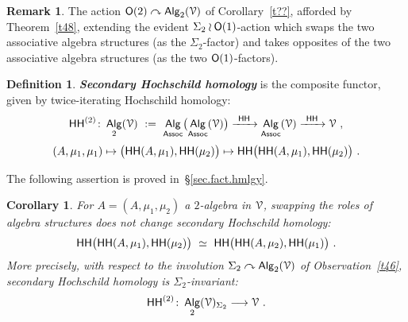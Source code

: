 \documentclass{amsart}
\newtheorem{cor}[theorem]{Corollary}
\theoremstyle{definition}
\newtheorem{definition}[theorem]{Definition}
\newtheorem{remark}[theorem]{Remark}
\theoremstyle{remark}
\DeclareMathOperator{\Alg}{\sf Alg}
\newcommand{\bit}[1]{\textbf{\textit{#1}}}
\newcommand{\lacts}{\curvearrowright}
\newcommand{\xra}{\xrightarrow}
\DeclareMathOperator{\sHH}{\sf HH}
\DeclareMathOperator{\HHt}{{\sf HH}^{(2)}}
\begin{document}
\begin{remark}
The action $\sO(2)
\lacts
\Alg_2(\cV)$ of Corollary~\ref{t??}, afforded by Theorem~\ref{t48}, 
extending the evident $\Sigma_2 \wr \mathsf O(1)$-action which swaps the two associative algebra structures (as the $\Sigma_2$-factor) and takes opposites of the two associative algebra structures (as the two $\mathsf O(1)$-factors).
\end{remark}






\begin{definition}
\label{d5}
\bit{Secondary Hochschild homology} is the composite functor, given by twice-iterating Hochschild homology:
\[
\HHt
\colon
\Alg_2(\cV)
~:=~
\Alg_{\sf Assoc}\bigl(
\Alg_{\sf Assoc}(\cV)
\bigr)
\xra{~\sHH~}
\Alg_{\sf Assoc}(\cV)
\xra{~\sHH~}
\cV
~,
\]
\[
(A,\mu_1,\mu_1)
\mapsto
\bigl( \sHH(A,\mu_1) , \sHH(\mu_2) \bigr)
\mapsto
\sHH\bigl( 
\sHH(A,\mu_1)
,
\sHH(\mu_2)
\bigr)
~.
\]

\end{definition}









The following assertion is proved in~\S\ref{sec.fact.hmlgy}.
\begin{cor}
\label{t45}
For $A = (A,\mu_1,\mu_2)$ a $2$-algebra in $\mathcal V$, swapping the roles of algebra structures does not change secondary Hochschild homology:
\[
\sHH\bigl( 
\sHH(A,\mu_1)
,
\sHH(\mu_2)
\bigr)
~\simeq~
\sHH\bigl( 
\sHH(A,\mu_2)
,
\sHH(\mu_1)
\bigr)
~.
\]
More precisely, with respect to the involution $\Sigma_2 \lacts \Alg_2(\cV)$ of Observation~\ref{t46}, secondary Hochschild homology is $\Sigma_2$-invariant:
\[
\HHt\colon \Alg_2(\cV)_{\Sigma_2}
\longrightarrow
\cV
~.
\]

\end{cor}
\end{document}

